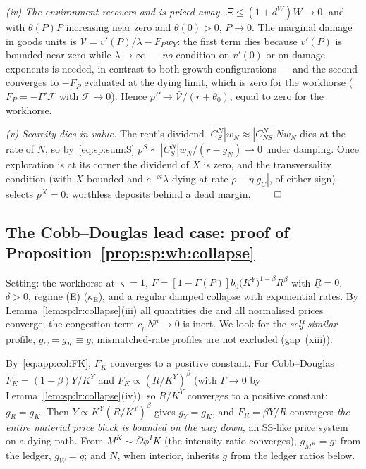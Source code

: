 \emph{(iv) The environment recovers and is priced away.} $\Xi\le\left(1+d^W\right)W\to0$, and
with $\theta\!\left(P\right)P$ increasing near zero and $\theta\!\left(0\right)>0$, $P\to0$.
The marginal damage in goods units is
$\mathcal V=v'\!\left(P\right)/\lambda-F_Pw_Y$: the first term dies because $v'\!\left(P\right)$
is bounded near zero while $\lambda\to\infty$ --- \emph{no} condition on $v'\!\left(0\right)$
or on damage exponents is needed, in contrast to both growth configurations --- and the
second converges to $-F_P$ evaluated at the dying limit, which is zero for the workhorse
($F_P=-\Gamma'\mathcal F$ with $\mathcal F\to0$). Hence $p^P\to\bar{\mathcal V}/\left(\bar r
+\theta_0\right)$, equal to zero for the workhorse.

\emph{(v) Scarcity dies in value.} The rent's dividend
$\left|C^N_S\right|w_N\approx\left|C^N_{NS}\right|Nw_N$ dies at the rate of $N$, so
by~\eqref{eq:sp:sum:S} $p^S\sim\left|C^N_S\right|w_N/\left(r-g_N\right)\to0$ under damping.
Once exploration is at its corner the dividend of $X$ is zero, and the transversality
condition (with $X$ bounded and $e^{-\rho t}\lambda$ dying at rate
$\rho-\eta\left|g_C\right|$, of either sign) selects $p^X=0$: worthless deposits behind a
dead margin. \hfill$\qed$

\subsection{The Cobb--Douglas lead case: proof of Proposition~\ref{prop:sp:wh:collapse}}
\label{sec:app:collapse:cd}

Setting: the workhorse at $\varsigma=1$,
$F=\left[1-\Gamma\!\left(P\right)\right]b_0\big(K^Y\big)^{1-\beta}R^{\beta}$ with
$\underline R=0$, $\delta>0$, regime (E) ($\kappa_{\mathrm E}$), and a regular damped collapse
with exponential rates. By Lemma~\ref{lem:sp:lr:collapse}(iii) all quantities die and all
normalised prices converge; the congestion term $c_\mu N^\mu\to0$ is inert. We look for the
\emph{self-similar} profile, $g_C=g_K\equiv g$; mismatched-rate profiles are not excluded
(gap~(xiii)).

 By~\eqref{eq:app:col:FK}, $F_K$ converges to a positive
constant. For Cobb--Douglas $F_K=\left(1-\beta\right)Y/K^Y$ and
$F_K\propto\left(R/K^Y\right)^\beta$ (with $\Gamma\to0$ by
Lemma~\ref{lem:sp:lr:collapse}(iv)), so $R/K^Y$ converges to a positive constant: $g_R=g_K$.
Then $Y\propto K^Y\left(R/K^Y\right)^\beta$ gives $g_Y=g_K$, and $F_R=\beta Y/R$ converges:
\emph{the entire material price block is bounded on the way down}, an SS-like price system on
a dying path. From $M^K\sim\bar\Omega\phi^IK$ (the intensity ratio converges),
$g_{M^K}=g$; from the ledger, $g_W=g$; and $N$, when interior, inherits $g$ from the ledger
ratios below.


